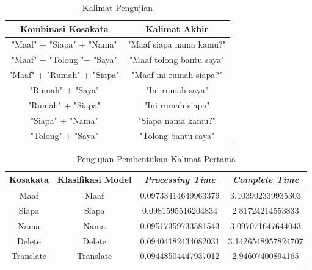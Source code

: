 \begin{longtable}{|c|c|}
  \caption{Kalimat Pengujian}
  \label{tb:kalimatpengujian}                                   \\
  \hline
  \rowcolor[HTML]{C0C0C0}
  \textbf{Kombinasi Kosakata} & \textbf{Kalimat Akhir}  \\
  \hline
  "Maaf" + "Siapa" + "Nama"            &  "Maaf siapa nama kamu?"               \\

  "Maaf" + "Tolong "+ "Saya"            & "Maaf tolong bantu saya"                 \\
  
  "Maaf" + "Rumah" + "Siapa"            & "Maaf ini rumah siapa?"                 \\

  "Rumah" + "Saya"            & "Ini rumah saya"                 \\

  "Rumah" + "Siapa"            & "Ini rumah siapa"                 \\

  "Siapa" + "Nama"            & "Siapa nama kamu?"                 \\

  "Tolong" + "Saya"            & "Tolong bantu saya"                 \\
  \hline
\end{longtable}

\begin{longtable}{|c|c|c|c|}
  \caption{Pengujian Pembentukan Kalimat Pertama}
  \label{tb:prediksikombinasi1}                                   \\
  \hline
  \rowcolor[HTML]{C0C0C0}
  \textbf{Kosakata} & \textbf{Klasifikasi Model} & \textbf{\emph{Processing Time}} & \textbf{\emph{Complete Time}}\\
  \hline
  Maaf              & Maaf                        & 0.09733414649963379                           & 3.103902339935303                                  \\
  Siapa            & Siapa                        & 0.0981595516204834                           & 2.81724214553833                                  \\
  Nama              & Nama                        & 0.09517359733581543                           & 3.097071647644043                                  \\
  Delete              & Delete                        & 0.09404182434082031                           & 3.1426548957824707                                  \\
  Translate              & Translate                        & 0.09448504447937012                           & 2.94607400894165                                  \\
  \hline
\end{longtable}

